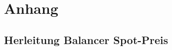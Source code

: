 \documentclass[12pt,a4paper,titlepage,oneside,english]{article}
\begin{document}


\newpage
\section{Anhang}


\subsection{Herleitung Balancer Spot-Preis}
\label{sec:Herleitung Balancer Spot-Preis}
\end{document}
